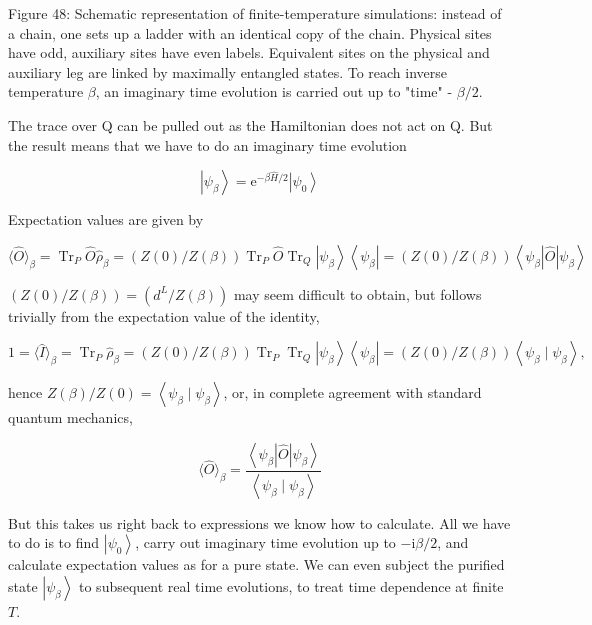 \documentclass[12pt]{article}
\begin{document}
Figure 48: Schematic representation of finite-temperature simulations: instead of a chain, one sets up a ladder with an identical copy of the chain. Physical sites have odd, auxiliary sites have even labels. Equivalent sites on the physical and auxiliary leg are linked by maximally entangled states. To reach inverse temperature $\beta$, an imaginary time evolution is carried out up to "time" - $\beta / 2$.

The trace over Q can be pulled out as the Hamiltonian does not act on Q. But the result means that we have to do an imaginary time evolution


\begin{equation*}
\left|\psi_{\beta}\right\rangle=\mathrm{e}^{-\beta \hat{H} / 2}\left|\psi_{0}\right\rangle \tag{237}
\end{equation*}


Expectation values are given by


\begin{equation*}
\langle\hat{O}\rangle_{\beta}=\operatorname{Tr}_{P} \hat{O} \hat{\rho}_{\beta}=(Z(0) / Z(\beta)) \operatorname{Tr}_{P} \hat{O} \operatorname{Tr}_{Q}\left|\psi_{\beta}\right\rangle\left\langle\psi_{\beta}\right|=(Z(0) / Z(\beta))\left\langle\psi_{\beta}|\hat{O}| \psi_{\beta}\right\rangle \tag{238}
\end{equation*}


$(Z(0) / Z(\beta))=\left(d^{L} / Z(\beta)\right)$ may seem difficult to obtain, but follows trivially from the expectation value of the identity,


\begin{equation*}
1=\langle\hat{I}\rangle_{\beta}=\operatorname{Tr}_{P} \hat{\rho}_{\beta}=(Z(0) / Z(\beta)) \operatorname{Tr}_{P} \operatorname{Tr}_{Q}\left|\psi_{\beta}\right\rangle\left\langle\psi_{\beta}\right|=(Z(0) / Z(\beta))\left\langle\psi_{\beta} \mid \psi_{\beta}\right\rangle, \tag{239}
\end{equation*}


hence $Z(\beta) / Z(0)=\left\langle\psi_{\beta} \mid \psi_{\beta}\right\rangle$, or, in complete agreement with standard quantum mechanics,


\begin{equation*}
\langle\hat{O}\rangle_{\beta}=\frac{\left\langle\psi_{\beta}|\hat{O}| \psi_{\beta}\right\rangle}{\left\langle\psi_{\beta} \mid \psi_{\beta}\right\rangle} \tag{240}
\end{equation*}


But this takes us right back to expressions we know how to calculate. All we have to do is to find $\left|\psi_{0}\right\rangle$, carry out imaginary time evolution up to $-\mathrm{i} \beta / 2$, and calculate expectation values as for a pure state. We can even subject the purified state $\left|\psi_{\beta}\right\rangle$ to subsequent real time evolutions, to treat time dependence at finite $T$.
\end{document}
